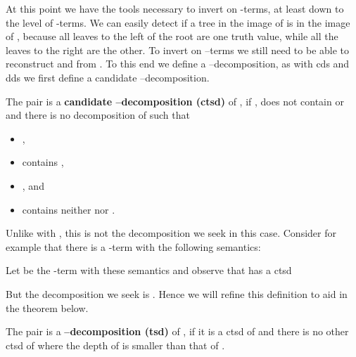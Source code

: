 At this point we have the tools necessary to invert  on -terms, at
least down to the level of -terms. We can easily detect if a tree in the
image of  is in the image of , because all leaves to the left of
the root are one truth value, while all the leaves to the right are the other.
To invert  on --terms we still need to be able to reconstruct
 and  from . To this end we
define a --decomposition, as with cds and dds we first define a
candidate --decomposition.

\begin{definition}
The pair  is a \textbf{candidate
--decomposition (ctsd)} of , if , 
does not contain  or  and there is no decomposition  of  such that
\begin{itemize}
\item ,
\item  contains ,
\item , and
\item  contains neither  nor .
\end{itemize}
\end{definition}

Unlike with , this is not the decomposition we seek in this case.
Consider for example that there is a -term with the following semantics:
\begin{center}
\endpgfgraphicnamed
\end{center}
Let  be the -term with these semantics and observe that
 has a ctsd

But the decomposition we seek is .
Hence we will refine this definition to aid in the theorem below.

\begin{definition}
The pair  is a \textbf{--decomposition
(tsd)} of , if it is a ctsd of  and there is no other ctsd  of  where the depth of  is smaller than that of .
\end{definition}

